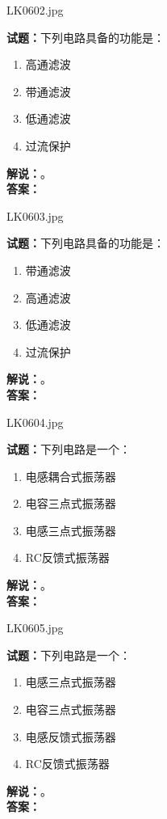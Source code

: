 \documentclass{ctexbook}
\begin{document}
\vspace{\baselineskip}

LK0602.jpg

\noindent\textbf{试题：}下列电路具备的功能是：
\begin{enumerate}[leftmargin=3em]
  \item 高通滤波
  \item 带通滤波
  \item 低通滤波
  \item 过流保护
\end{enumerate}
\noindent\textbf{解说：}\textbf{}。\\\noindent\textbf{答案：}

\vspace{\baselineskip}

LK0603.jpg

\noindent\textbf{试题：}下列电路具备的功能是：
\begin{enumerate}[leftmargin=3em]
  \item 带通滤波
  \item 高通滤波
  \item 低通滤波
  \item 过流保护
\end{enumerate}
\noindent\textbf{解说：}\textbf{}。\\\noindent\textbf{答案：}

\vspace{\baselineskip}

LK0604.jpg

\noindent\textbf{试题：}下列电路是一个：
\begin{enumerate}[leftmargin=3em]
  \item 电感耦合式振荡器
  \item 电容三点式振荡器
  \item 电感三点式振荡器
  \item RC反馈式振荡器
\end{enumerate}
\noindent\textbf{解说：}\textbf{}。\\\noindent\textbf{答案：}

\vspace{\baselineskip}

LK0605.jpg

\noindent\textbf{试题：}下列电路是一个：
\begin{enumerate}[leftmargin=3em]
  \item 电感三点式振荡器
  \item 电容三点式振荡器
  \item 电感反馈式振荡器
  \item RC反馈式振荡器
\end{enumerate}
\noindent\textbf{解说：}\textbf{}。\\\noindent\textbf{答案：}
\end{document}
